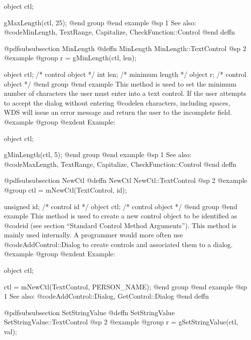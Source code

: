 object  ctl;

gMaxLength(ctl, 25);
@end group
@end example
@sp 1
See also:  @code{MinLength, TextRange, Capitalize, CheckFunction::Control}
@end deffn












@pdfsubsubsection {MinLength}
@deffn {MinLength} MinLength::TextControl
@sp 2
@example
@group
r = gMinLength(ctl, len);

object  ctl;   /*  control object  */
int     len;   /*  minimum length  */
object  r;     /*  control object  */
@end group
@end example
This method is used to set the minimum number of characters the user must
enter into a text control.  If the user attempts to accept the dialog
without entering @code{len} characters, including spaces, WDS will
issue an error message and return the user to the incomplete field.
@example
@group
@exdent Example:

object  ctl;

gMinLength(ctl, 5);
@end group
@end example
@sp 1
See also:  @code{MaxLength, TextRange, Capitalize, CheckFunction::Control}
@end deffn









@pdfsubsubsection {NewCtl}
@deffn {NewCtl} NewCtl::TextControl
@sp 2
@example
@group
ctl = mNewCtl(TextControl, id);

unsigned  id;   /*  control id      */
object   ctl;   /*  control object  */
@end group
@end example
This method is used to create a new control object to be identified as
@code{id} (see section ``Standard Control Method Arguments'').  This
method is mainly used internally.  A programmer would more often
use @code{AddControl::Dialog} to create controls and associated them
to a dialog.
@example
@group
@exdent Example:

object  ctl;

ctl = mNewCtl(TextControl, PERSON_NAME);
@end group
@end example
@sp 1
See also:  @code{AddControl::Dialog, GetControl::Dialog}
@end deffn










@pdfsubsubsection {SetStringValue}
@deffn {SetStringValue} SetStringValue::TextControl
@sp 2
@example
@group
r = gSetStringValue(ctl, val);

